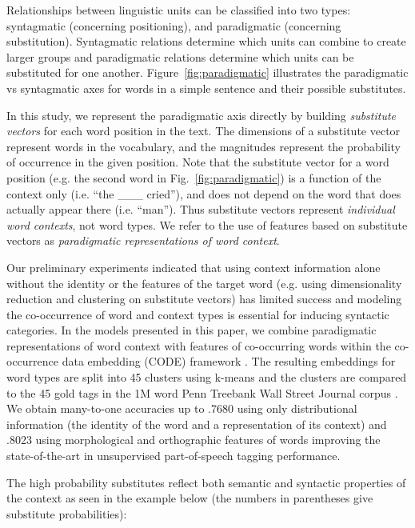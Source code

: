 \documentclass[11pt]{article}
\begin{document}
Relationships between linguistic units can be classified into two
types: syntagmatic (concerning positioning), and paradigmatic
(concerning substitution).  Syntagmatic relations determine which
units can combine to create larger groups and paradigmatic relations
determine which units can be substituted for one another.
Figure~\ref{fig:paradigmatic} illustrates the paradigmatic vs
syntagmatic axes for words in a simple sentence and their possible
substitutes.  

In this study, we represent the paradigmatic axis directly by building
{\em substitute vectors} for each word position in the text.  The
dimensions of a substitute vector represent words in the vocabulary,
and the magnitudes represent the probability of occurrence in the given
position.  Note that the substitute vector for a word position (e.g.
the second word in Fig.~\ref{fig:paradigmatic}) is a function of the
context only (i.e. ``the \_\_\_ cried''), and does not depend on the
word that does actually appear there (i.e. ``man'').  Thus substitute
vectors represent {\em individual word contexts}, not word types.  We
refer to the use of features based on substitute vectors as 
{\em paradigmatic representations of word context}.

Our preliminary experiments indicated that using context information
alone without the identity or the features of the target word
(e.g. using dimensionality reduction and clustering on substitute
vectors) has limited success and modeling the co-occurrence of word
and context types is essential for inducing syntactic categories.  In
the models presented in this paper, we combine paradigmatic
representations of word context with features of co-occurring words
within the co-occurrence data embedding (CODE) framework
\cite{globerson2007euclidean,maron2010sphere}.  The resulting
embeddings for word types are split into 45 clusters using k-means and
the clusters are compared to the 45 gold tags in the 1M word Penn
Treebank Wall Street Journal corpus \cite{treebank3}.  We obtain
many-to-one accuracies up to .7680 using only distributional
information (the identity of the word and a representation of its
context) and .8023 using morphological and orthographic features of
words improving the state-of-the-art in unsupervised part-of-speech
tagging performance.

The high probability substitutes reflect both semantic and syntactic
properties of the context as seen in the example below (the numbers in
parentheses give substitute probabilities):
\end{document}
